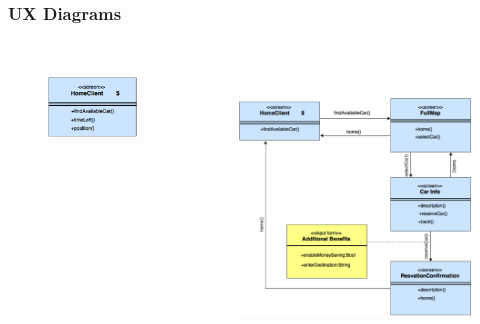 \begin{frame}
	\frametitle{UX Diagrams}
	\begin{columns}[c]
		\begin{figure}[H]
			\centering
			\includegraphics[height=2cm,keepaspectratio]{figures/resv_ux_diagram.eps}
			\label{fig:resv_ux_diagram}
		\end{figure}
		\begin{figure}[H]
			\centering
			\includegraphics[height=7.3cm,keepaspectratio]{figures/notresv_ux_diagram.eps}
			\label{fig:notresv_ux_diagram}
		\end{figure}
	\end{columns}
\end{frame}